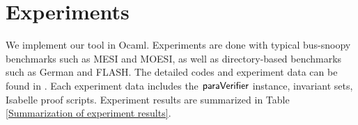 \documentclass[final]{IEEEtran}
\begin{document}
{%
\section{Experiments}\label{sec:experiments}
We implement our tool in Ocaml. %
 Experiments are
done with typical bus-snoopy benchmarks such as MESI and MOESI, as well as
 directory-based benchmarks such as  German and FLASH. The detailed codes and experiment data can
be found in \cite{LiCache16}. Each experiment data includes the
${\sf paraVerifier}$ instance, invariant sets, Isabelle proof
scripts.  Experiment results are summarized in Table \ref{Summarization of experiment results}.




}
\end{document}
